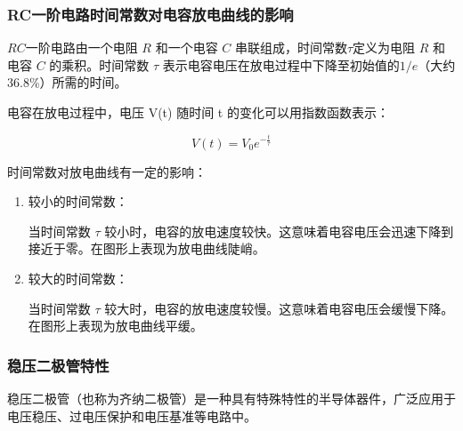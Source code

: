 \documentclass[dvipsnames, svgnames,a4paper,11pt]{article}
\begin{document}
		\subsubsection*{RC一阶电路时间常数对电容放电曲线的影响}

			$RC$一阶电路由一个电阻 $R$ 和一个电容 $C$ 串联组成，时间常数$\tau$定义为电阻 $R$ 和电容 $C$ 的乘积。时间常数 $\tau$ 表示电容电压在放电过程中下降至初始值的$1/e$（大约36.8\%）所需的时间。

			电容在放电过程中，电压 V(t) 随时间 t 的变化可以用指数函数表示：

			\[
				V(t) = V_0 e^{-\frac{t}{\tau}}
			\]
		
			时间常数对放电曲线有一定的影响：
			\begin{enumerate}
				\item 较小的时间常数：
				
				当时间常数 $\tau$ 较小时，电容的放电速度较快。这意味着电容电压会迅速下降到接近于零。在图形上表现为放电曲线陡峭。

				\item 较大的时间常数：
				
				当时间常数 $\tau$ 较大时，电容的放电速度较慢。这意味着电容电压会缓慢下降。在图形上表现为放电曲线平缓。

			\end{enumerate}







		\subsubsection*{稳压二极管特性}


			稳压二极管（也称为齐纳二极管）是一种具有特殊特性的半导体器件，广泛应用于电压稳压、过电压保护和电压基准等电路中。
\end{document}
